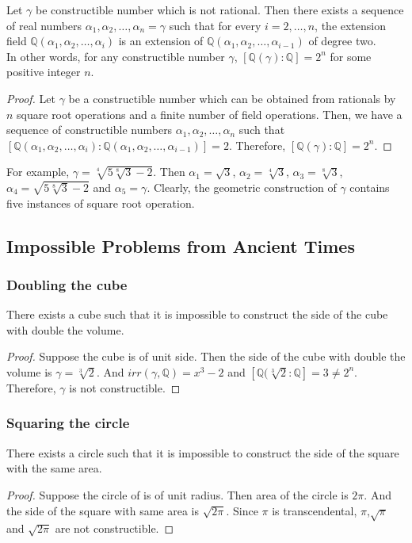 \begin{corollary}
	Let $\gamma$ be constructible number which is not rational. Then there exists a sequence of real numbers $\alpha_1,\alpha_2,\dots,\alpha_n = \gamma$ such that for every $i = 2,\dots,n$, the extension field $\mathbb{Q}(\alpha_1,\alpha_2,\dots,\alpha_i)$ is an extension of $\mathbb{Q}(\alpha_1,\alpha_2,\dots,\alpha_{i-1})$ of degree two.\\

	In other words, for any constructible number $\gamma$, $[\mathbb{Q}(\gamma) : \mathbb{Q}] = 2^n$ for some positive integer $n$.
\end{corollary}
\begin{proof}
	Let $\gamma$ be a constructible number which can be obtained from rationals by $n$ square root operations and a finite number of field operations. Then, we have a sequence of constructible numbers $\alpha_1, \alpha_2,\dots, \alpha_n$ such that $[\mathbb{Q}(\alpha_1,\alpha_2,\dots,\alpha_i) : \mathbb{Q}(\alpha_1,\alpha_2,\dots,\alpha_{i-1})] = 2$. Therefore, $[\mathbb{Q}(\gamma) : \mathbb{Q}] = 2^n$.
\end{proof}

	For example, $\gamma = \sqrt[4]{5\sqrt[8]{3}-2}$. Then $\alpha_1 = \sqrt{3}$, $\alpha_2 = \sqrt[4]{3}$, $\alpha_3= \sqrt[8]{3}$, $\alpha_4 = \sqrt{5\sqrt[8]{3}-2}$ and $\alpha_5 = \gamma$. Clearly, the geometric construction of $\gamma$ contains five instances of square root operation.

\subsection{Impossible Problems from Ancient Times}
\subsubsection{Doubling the cube}
\begin{theorem}
	There exists a cube such that it is impossible to construct the side of the cube with double the volume.
\end{theorem}
\begin{proof}
	Suppose the cube is of unit side. Then the side of the cube with double the volume is $\gamma = \sqrt[3]{2}$. And $irr(\gamma,\mathbb{Q}) = x^3-2$ and $[\mathbb{Q}(\sqrt[3]{2}:\mathbb{Q}] = 3 \ne 2^n$. Therefore, $\gamma$ is not constructible.
\end{proof}
\subsubsection{Squaring the circle}
\begin{theorem}
	There exists a circle such that it is impossible to construct the side of the square with the same area.
\end{theorem}
\begin{proof}
	Suppose the circle of is of unit radius. Then area of the circle is $2\pi$. And the side of the square with same area is $\sqrt{2\pi}$. Since $\pi$ is transcendental, $\pi$,$\sqrt{\pi}$ and $\sqrt{2\pi}$ are not constructible.
\end{proof}
